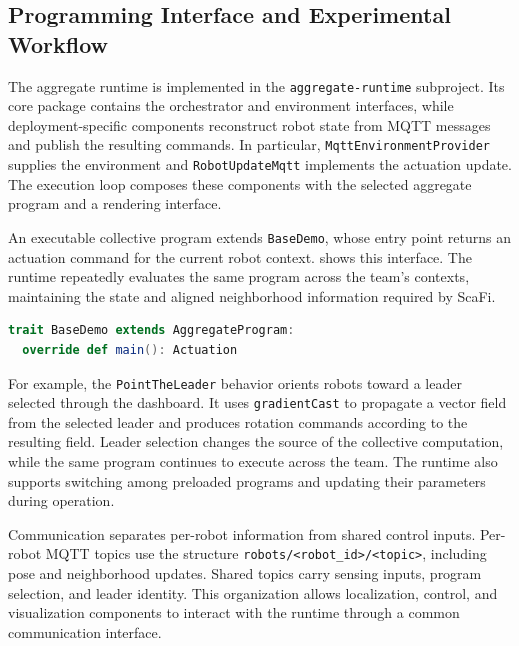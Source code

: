 \subsection{Programming Interface and Experimental Workflow}
\label{sec:emerge-workflow}

The aggregate runtime is implemented in the
 \texttt{aggregate-runtime} subproject.
%
Its core package contains the orchestrator and environment interfaces,
 while deployment-specific components reconstruct robot state from MQTT
 messages and publish the resulting commands.
%
In particular, \texttt{MqttEnvironmentProvider} supplies the environment
 and \texttt{RobotUpdateMqtt} implements the actuation update.
%
The execution loop composes these components with the selected aggregate
 program and a rendering interface.

An executable collective program extends \texttt{BaseDemo}, whose entry
 point returns an actuation command for the current robot context.
%
 shows this interface.
%
The runtime repeatedly evaluates the same program across the team's
 contexts, maintaining the state and aligned neighborhood information
 required by ScaFi.

\begin{lstlisting}[language=scala,breaklines=true,
  caption={Entry point for collective robot programs in Project Emerge.},
  label={lst:emerge-program-interface}]
trait BaseDemo extends AggregateProgram:
  override def main(): Actuation
\end{lstlisting}

For example, the \texttt{PointTheLeader} behavior orients robots toward a
 leader selected through the dashboard.
%
It uses \texttt{gradientCast} to propagate a vector field from the selected
 leader and produces rotation commands according to the resulting field.
%
Leader selection changes the source of the collective computation, while
 the same program continues to execute across the team.
%
The runtime also supports switching among preloaded programs and updating
 their parameters during operation.

Communication separates per-robot information from shared control inputs.
%
Per-robot MQTT topics use the structure
 \texttt{robots/<robot\_id>/<topic>}, including pose and neighborhood updates.
%
Shared topics carry sensing inputs, program selection, and leader identity.
%
This organization allows localization, control, and visualization components
 to interact with the runtime through a common communication interface.

